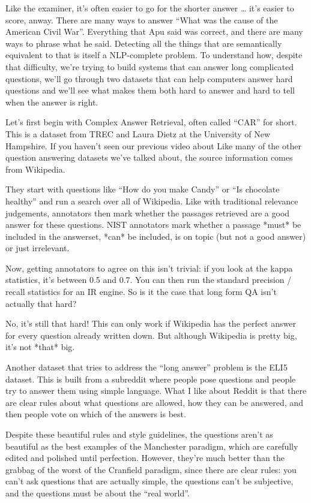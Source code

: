 Like the examiner, it’s often easier to go for the shorter answer … it’s easier to score, anway.   There are many ways to answer “What was the cause of the American Civil War”.  Everything that Apu said was correct, and there are many ways to phrase what he said.  Detecting all the things that are semantically equivalent to that is itself a NLP-complete problem.  To understand how, despite that difficulty, we’re trying to build systems that can answer long complicated questions, we’ll go through two datasets that can help computers answer hard questions and we’ll see what makes them both hard to answer and hard to tell when the answer is right.

Let’s first begin with Complex Answer Retrieval, often called “CAR” for short.  This is a dataset from TREC and Laura Dietz at the University of New Hampshire.  If you haven’t seen our previous video about Like many of the other question answering datasets we’ve talked about, the source information comes from Wikipedia.  

They start with questions like “How do you make Candy” or “Is chocolate healthy” and run a search over all of Wikipedia.  Like with traditional relevance judgements, annotators then mark whether the passages retrieved are a good answer for these questions.  NIST annotators mark whether a passage *must* be included in the answerset, *can* be included, is on topic (but not a good answer) or just irrelevant. 

Now, getting annotators to agree on this isn’t trivial: if you look at the kappa statistics, it’s between 0.5 and 0.7.  You can then run the standard precision / recall statistics for an IR engine.  So is it the case that long form QA isn’t actually that hard?

No, it’s still that hard!  This can only work if Wikipedia has the perfect answer for every question already written down.  But although Wikipedia is pretty big, it’s not *that* big.  

Another dataset that tries to address the “long answer” problem is the ELI5 dataset.  This is built from a subreddit where people pose questions and people try to answer them using simple language.  What I like about Reddit is that there are clear rules about what questions are allowed, how they can be answered, and then people vote on which of the answers is best.

Despite these beautiful rules and style guidelines, the questions aren’t as beautiful as the best examples of the Manchester paradigm, which are carefully edited and polished until perfection.  However, they’re much better than the grabbag of the worst of the Cranfield paradigm, since there are clear rules: you can’t ask questions that are actually simple, the questions can’t be subjective, and the questions must be about the “real world”.

